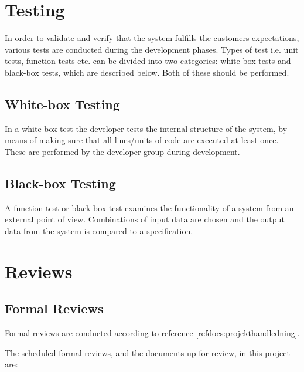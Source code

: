 \documentclass[a4paper]{article}
\begin{document}
\section{Testing}
In order to validate and verify that the system fulfills the customers expectations, various tests are conducted during the development phases. Types of test i.e. unit tests, function tests etc. can be divided into two categories: white-box tests and black-box tests, which are described below. Both of these should be performed.  

\subsection{White-box Testing}
In a white-box test the developer tests the internal structure of the system, by means of making sure that all lines/units of code are executed at least once. These are performed by the developer group during development.

\subsection{Black-box Testing}
A function test or black-box test examines the functionality of a system from an external point of view. Combinations of input data are chosen and the output data from the system is compared to a specification.


\section{Reviews}

\subsection{Formal Reviews}
Formal reviews are conducted according to reference \ref{refdocs:projekthandledning}.

The scheduled formal reviews, and the documents up for review, in this project are:
\end{document}

